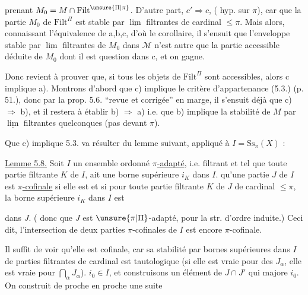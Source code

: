 
prenant $M_0=M\cap\mathrm{Filt}^{\unsure{\Pi|\pi}}$. D'autre part, $c'\Rightarrow c$, ( hyp. sur $\pi$), car   que la partie $M_0$ de $\mathrm{Filt}^{\Pi}$ est stable par $\underline{\lim}$ filtrantes de cardinal $\leq\pi$. Mais alors, connaissant l'équivalence de a,b,c, d'où  le corollaire, il  s'ensuit que l'enveloppe stable par $\underline{\lim}$ filtrantes de $M_0$ dans $\mathcal M$  n'est autre que la partie accessible  déduite de $M_0$ dont il est question dans c, et on gagne.

Donc  revient à prouver que, si tous les objets de $\mathrm{Filt}^{\Pi}$ sont accessibles, alors c implique a). Montrons d'abord que c) implique le critère d'appartenance  (5.3.) (p. 51.), donc par la  prop. 5.6. ``revue et corrigée'' en marge, il s'ensuit déjà que c) $\Rightarrow$ b), et il restera à établir b) $\Rightarrow$ a) i.e. que b) implique la stabilité de $M$ par $\underline{\lim}$ filtrantes quelconques (pas   devant $\pi$).

Que c) implique 5.3. va résulter du lemme suivant, appliqué à $I=\mathrm{Ss}_\pi(X)$ :

\uline{Lemme 5.8.} Soit $I$ un ensemble ordonné \uline{$\pi$-adapté}, i.e. filtrant et tel que toute partie filtrante $K$ de $I$,  ait une borne supérieure $i_K$ dans $I$.    qu'une partie  $J$ de $I$ est  \uline{$\pi$-cofinale} si elle est   et si pour toute partie filtrante $K$ de $J$ de cardinal $\leq\pi$, la borne supérieure $i_K$ dans $I$ est


dans $J$. (  donc que $J$ est  $\unsure{\pi|\Pi}$-adapté, pour la str. d'ordre induite.) Ceci dit,  l'intersection de deux parties $\pi$-cofinales de $I$ est encore $\pi$-cofinale.

Il suffit de voir qu'elle est cofinale, car sa stabilité par bornes supérieures dans $I$ de parties filtrantes de cardinal est tautologique (si elle est vraie pour des $J_\alpha$, elle est vraie pour $\bigcap_\alpha J_\alpha$).   $i_0\in I$,  et construisons un élément de $J\cap J'$ qui  majore $i_0$.  On construit de proche en proche une  suite

